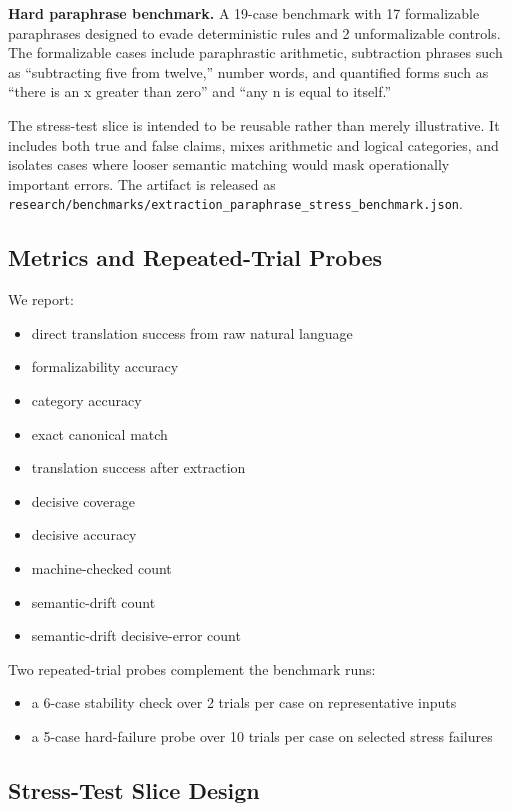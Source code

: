 \documentclass[11pt]{article}
\begin{document}
\textbf{Hard paraphrase benchmark.} A 19-case benchmark with 17 formalizable
paraphrases designed to evade deterministic rules and 2 unformalizable
controls. The formalizable cases include paraphrastic arithmetic, subtraction
phrases such as ``subtracting five from twelve,'' number words, and quantified
forms such as ``there is an x greater than zero'' and ``any n is equal to
itself.''

The stress-test slice is intended to be reusable rather than merely
illustrative. It includes both true and false claims, mixes arithmetic and
logical categories, and isolates cases where looser semantic matching would
mask operationally important errors. The artifact is released as
\nolinkurl{research/benchmarks/extraction_paraphrase_stress_benchmark.json}.

\subsection{Metrics and Repeated-Trial Probes}

We report:

\begin{itemize}
  \item direct translation success from raw natural language
  \item formalizability accuracy
  \item category accuracy
  \item exact canonical match
  \item translation success after extraction
  \item decisive coverage
  \item decisive accuracy
  \item machine-checked count
  \item semantic-drift count
  \item semantic-drift decisive-error count
\end{itemize}

Two repeated-trial probes complement the benchmark runs:

\begin{itemize}
  \item a 6-case stability check over 2 trials per case on representative
  inputs
  \item a 5-case hard-failure probe over 10 trials per case on selected stress
  failures
\end{itemize}

\subsection{Stress-Test Slice Design}
\end{document}
